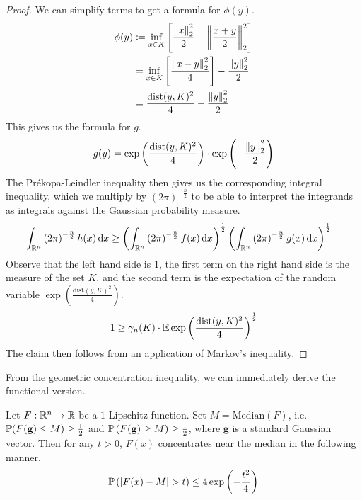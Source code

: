 \documentclass[11pt]{article}
\begin{document}
\begin{proof}
  We can simplify terms to get a formula for $\phi(y)$.
  \begin{align*}
    \phi(y) &\coloneqq \inf_{x \in K} \left[ \frac{\norm{x}_2^2}{2} - \norm{\frac{x+y}{2}}_2^2 \right] \\
            &= \inf_{x \in K} \left[ \frac{\norm{x-y}_2^2}{4} \right] - \frac{\norm{y}_2^2}{2} \\
            &= \frac{ \mathrm{dist}(y, K)^2}{4}  - \frac{\norm{y}_2^2}{2}
  \end{align*}
  This gives us the formula for $g$.
  \begin{align*}
    g(y) = \exp\left( \frac{\mathrm{dist}(y, K)^2}{4} \right) \cdot \exp\left( - \frac{\norm{y}_2^2}{2} \right)
  \end{align*}
  The Pr\'ekopa-Leindler inequality then gives us the corresponding integral inequality, which we multiply by $\left( 2 \pi \right)^{- \frac{n}{2}}$ to be able to interpret the integrands as integrals against the Gaussian probability measure.
  \begin{align*}
    \int_{\R^n} \left( 2\pi \right)^{-\frac{n}{2}} h(x) \dd x
    &\geq \left( \int_{\R^n}\left( 2\pi \right)^{-\frac{n}{2}} f(x) \dd x \right)^{\frac{1}{2}}
      \left( \int_{\R^n}\left( 2\pi \right)^{-\frac{n}{2}} g(x) \dd x \right)^{\frac{1}{2}}
  \end{align*}
  Observe that the left hand side is $1$, the first term on the right hand side is the measure of the set $K$, and the second term is the expectation of the random variable $\exp\left( \frac{\mathrm{dist}(y, K)^2}{4} \right)$.
  \begin{align*}
    1 \geq \gamma_n(K) \cdot \E \exp\left( \frac{\mathrm{dist}(y, K)^2}{4} \right)^{\frac{1}{2}}
  \end{align*}
  The claim then follows from an application of Markov's inequality.
\end{proof}
From the geometric concentration inequality, we can immediately derive the functional version.
\begin{theorem}
  Let $F: \R^n \to \R$ be a $1$-Lipschitz function.
  Set $M = \mathrm{Median}(F)$, i.e. $\P(F(\mathbf{g}) \leq M) \geq \frac{1}{2}$ and $\P\left( F(\mathbf{g}) \geq M \right) \geq \frac{1}{2}$, where $\mathbf{g}$ is a standard Gaussian vector.
  Then for any $t > 0$, $F(x)$ concentrates near the median in the following manner.
  \begin{align*}
    \P\left( \left| F(x) - M \right| > t \right) \leq 4 \exp\left( - \frac{t^2}{4} \right)
  \end{align*}
\end{theorem}
\end{document}
